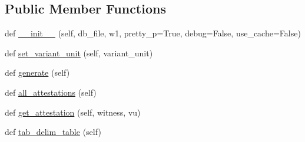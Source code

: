 \subsection*{Public Member Functions}
\begin{DoxyCompactItemize}
\item 
def \hyperlink{classCBGM_1_1lib_1_1pre__genealogical__coherence_1_1Coherence_ae6841155c04b8c5dcf22279b008cb96e}{\+\_\+\+\_\+init\+\_\+\+\_\+} (self, db\+\_\+file, w1, pretty\+\_\+p=True, debug=False, use\+\_\+cache=False)
\item 
def \hyperlink{classCBGM_1_1lib_1_1pre__genealogical__coherence_1_1Coherence_af601453fe8d3cd09f1aff40cab2eb337}{set\+\_\+variant\+\_\+unit} (self, variant\+\_\+unit)
\item 
def \hyperlink{classCBGM_1_1lib_1_1pre__genealogical__coherence_1_1Coherence_a08998731ef4735695399d884926caa1f}{generate} (self)
\item 
def \hyperlink{classCBGM_1_1lib_1_1pre__genealogical__coherence_1_1Coherence_a3cce8769d2fb90b5290231dc8fffb949}{all\+\_\+attestations} (self)
\item 
def \hyperlink{classCBGM_1_1lib_1_1pre__genealogical__coherence_1_1Coherence_a3e7881f5c9a2e7c2762c4d747bf0f4f5}{get\+\_\+attestation} (self, witness, vu)
\item 
def \hyperlink{classCBGM_1_1lib_1_1pre__genealogical__coherence_1_1Coherence_a977c8850361d5d9cf60d0098cdc0e4a7}{tab\+\_\+delim\+\_\+table} (self)
\end{DoxyCompactItemize}
